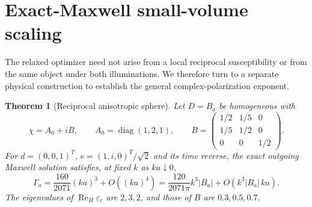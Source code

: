 \documentclass[11pt]{article}
\newtheorem{theorem}{Theorem}[section]
\newcommand{\ReH}{\operatorname{Re}_{\!H}}
\newcommand{\abs}[1]{\lvert #1\rvert}
\begin{document}
\section{Exact-Maxwell small-volume scaling}\label{sec:sphere}
The relaxed optimizer need not arise from a local reciprocal susceptibility or from the same object under both illuminations. We therefore turn to a separate physical construction to establish the general complex-polarization exponent.

\begin{theorem}[Reciprocal anisotropic sphere]\label{thm:sphere}
Let $D=B_a$ be homogeneous with
\begin{equation}\label{eq:sphere-tensor}
 \chi=A_0+iB,\qquad A_0=\operatorname{diag}(1,2,1),\qquad
 B=\begin{pmatrix}1/2&1/5&0\\1/5&1/2&0\\0&0&1/2\end{pmatrix}.
\end{equation}
For $d=(0,0,1)^T$, $e=(1,i,0)^T/\sqrt2$ and its time reverse, the exact outgoing Maxwell solution satisfies, at fixed $k$ as $ka\downarrow0$,
\begin{equation}\label{eq:sphere-asymptotic}
 \Gamma_a=\frac{160}{2071}(ka)^3+O((ka)^4)
 =\frac{120}{2071\pi}k^3\abs{B_a}
       +O(k^3\abs{B_a}\,ka).
\end{equation}
The eigenvalues of $\ReH\varepsilon_r$ are $2,3,2$, and those of $B$ are $0.3,0.5,0.7$.
\end{theorem}
\end{document}
